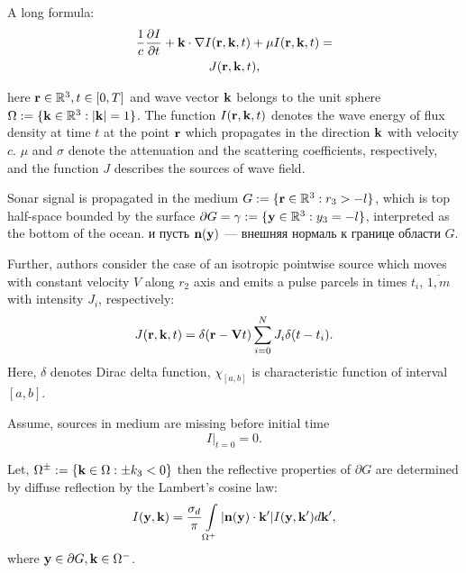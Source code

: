 \documentclass{procDDs}
\begin{document}
A long formula:
\begin{multline}
	\label{model}
	\frac{1}{c} \frac{\partial I}{\partial t} + \mathbf{k} \cdot \nabla I(\mathbf{r},\mathbf{k},t) + 
	\mu I(\mathbf{r},\mathbf{k},t) = \\ J(\mathbf{r},\mathbf{k},t),
\end{multline}

here $\mathbf{r} \in \mathbb{R}^3, t \in [0, T]$ and wave vector $\mathbf{k}$ belongs to the unit sphere $\Omega := \{\mathbf{k} \in \mathbb{R}^3: |\mathbf{k}| = 1\}$. The function $I(\mathbf{r},\mathbf{k}, t)$ denotes the wave energy of flux density at time $t$  at the point $\mathbf{r}$ which propagates in the direction $\mathbf{k}$  with velocity $c$. $\mu$ and $\sigma$ denote the attenuation and the scattering coefficients, respectively, and the function $J$ describes the sources of
wave field.

Sonar signal is propagated in the medium $G:=\{\mathbf{r} \in \mathbb{R}^3:r_3 > -l\}$, which is top half-space bounded by the surface $\partial G = \gamma := \{\mathbf{y} \in \mathbb{R}^3: y_3 = -l \}$, interpreted as the bottom of the ocean. и пусть $\textbf{n}(\mathbf{y})$ --- внешняя нормаль к  границе области $G$. 



Further, authors consider the case of an isotropic pointwise source which moves with constant velocity $V$ along $r_2$ axis and emits a pulse parcels in times $t_i$, $\overline{1,m}$ with intensity $J_i$, respectively: 
\begin{equation}
	\label{source}
	J(\mathbf{r},\mathbf{k}, t) = \delta(\mathbf{r} - \mathbf{V} t)\sum\limits_{i=0}^{N} J_i \delta(t-t_i).
\end{equation}
Here, $\delta$ denotes Dirac delta function, $\chi_{[a,b]}$ is characteristic function of interval $[a,b]$.

Assume, sources in medium are missing before initial time
\begin{equation}
	\label{init_cond}
	I\rvert_{t=0}=0.
\end{equation}

Let, $\Omega^\pm := \{\mathbf{k} \in \Omega: \pm k_3 < 0\}$ then the reflective properties of $\partial G$  are determined by diffuse reflection by the Lambert’s cosine law:
\begin{equation}
	\label{boundary_condition}
	I(\mathbf{y},\mathbf{k}) = \frac{\sigma_d}{\pi} \int\limits_{\Omega ^+}|\mathbf{n}(\mathbf{y})\cdot \mathbf{k}'| I(\mathbf{y},\mathbf{k}') d\mathbf{k}' ,
\end{equation}
where  $\mathbf{y} \in \partial G, \mathbf{k} \in \Omega^-$.
\end{document}
